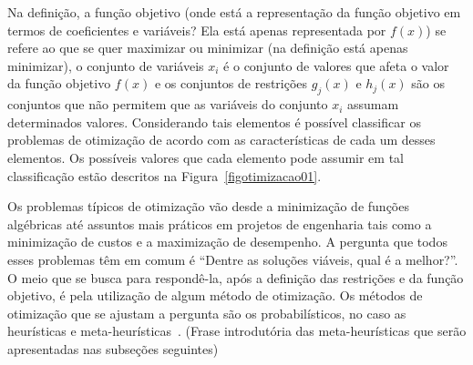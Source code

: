 Na definição, a função objetivo (onde está a representação da função objetivo em termos de coeficientes e variáveis? Ela está apenas representada por $f(x)$) se refere ao que se quer maximizar ou minimizar (na definição está apenas minimizar), o conjunto de variáveis $x_i$ é o conjunto de valores que afeta o valor da função objetivo $f(x)$ e os conjuntos de restrições $g_j(x)$ e $h_j(x)$ são os conjuntos que não permitem que as variáveis do conjunto $x_i$ assumam determinados valores. Considerando tais elementos é possível classificar os problemas de otimização de acordo com as características de cada um desses elementos. Os possíveis valores que cada elemento pode assumir em tal classificação estão descritos na Figura~\ref{figotimizacao01}.

Os problemas típicos de otimização vão desde a minimização de funções algébricas
até assuntos mais práticos em projetos de engenharia tais como a minimização de
custos e a maximização de desempenho. A pergunta que todos esses problemas têm
em comum é ``Dentre as soluções viáveis, qual é a melhor?''. O meio que se busca
para respondê-la, após a definição das restrições e da função objetivo, é pela
utilização de algum método de otimização. Os métodos de otimização que se
ajustam a pergunta são os probabilísticos, no caso as heurísticas e
meta-heurísticas~\cite{gandomi2013metaheuristic}. (Frase introdutória das
meta-heurísticas que serão apresentadas nas subseções seguintes)

